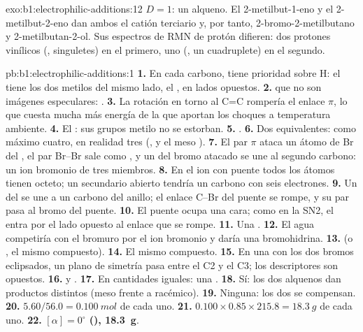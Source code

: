 \begin{solution}{exo:b1:electrophilic-additions:12}
$D = 1$: un alqueno. El 2-metilbut-1-eno y el 2-metilbut-2-eno dan ambos
el catión terciario y, por tanto, 2-bromo-2-metilbutano y
2-metilbutan-2-ol. Sus espectros de RMN de protón difieren: dos protones
vinílicos (, singuletes) en el primero, uno (, un
cuadruplete) en el segundo.
\end{solution}

\begin{solution}{pb:b1:electrophilic-additions:1}
\textbf{1.} En cada carbono,  tiene prioridad sobre H: el 
tiene los dos metilos del mismo lado, el , en lados opuestos.
\textbf{2.}  que no son imágenes especulares:
.
\textbf{3.} La rotación en torno al C=C rompería el enlace $\pi$, lo que
cuesta mucha más energía de la que aportan los choques a temperatura
ambiente.
\textbf{4.} El : sus grupos metilo no se estorban.
\textbf{5.} .
\textbf{6.} Dos  equivalentes: como máximo cuatro,
en realidad tres (,  y el meso ).
\textbf{7.} El par $\pi$ ataca un átomo de Br del , el par Br--Br
sale como , y un  del bromo atacado se une al
segundo carbono: un ion bromonio de tres miembros.
\textbf{8.} En el ion con puente todos los átomos tienen octeto; un
 secundario abierto tendría un carbono con seis electrones.
\textbf{9.} Un  del  se une a un carbono del
anillo; el enlace C--Br del puente se rompe, y su par pasa al bromo del
puente.
\textbf{10.} El puente ocupa una cara; como en la SN2, el  entra
por el lado opuesto al enlace que se rompe.
\textbf{11.} Una .
\textbf{12.} El agua competiría con el bromuro por el ion bromonio y daría
una bromohidrina.
\textbf{13.}  (o , el mismo compuesto).
\textbf{14.} El mismo compuesto.
\textbf{15.} En una  con los dos bromos eclipsados, un plano
de simetría pasa entre el C2 y el C3; los descriptores son opuestos.
\textbf{16.}  y .
\textbf{17.} En cantidades iguales: una .
\textbf{18.} Sí: los dos alquenos  dan productos
distintos (meso frente a racémico).
\textbf{19.} Ninguna: los dos  se compensan.
\textbf{20.} $5.60/56.0 = \qty{0.100}{mol}$ de cada uno.
\textbf{21.} $0.100 \times 0.85 \times 215.8 = \qty{18.3}{g}$ de cada uno.
\textbf{22.} \textbf{$[\alpha] = 0^\circ$ (), \qty{18.3}{g}}.
\end{solution}
